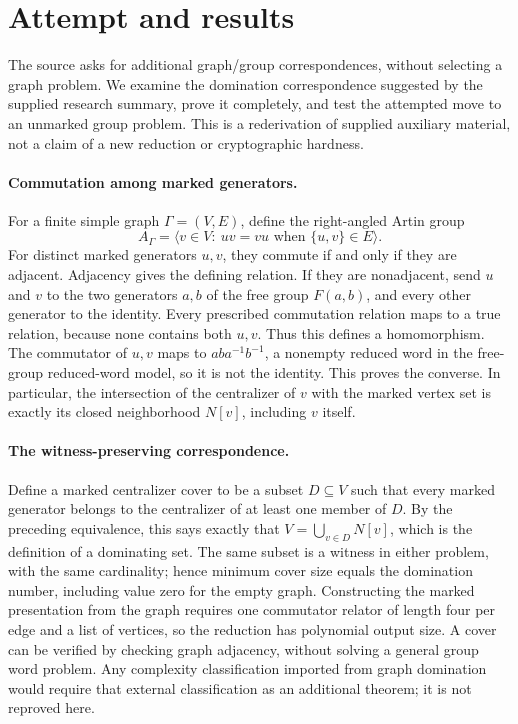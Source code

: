 \documentclass[11pt]{article}
\begin{document}
\section{Attempt and results}
The source asks for additional graph/group correspondences, without selecting
a graph problem. We examine the domination correspondence suggested by the
supplied research summary, prove it completely, and test the attempted move
to an unmarked group problem. This is a rederivation of supplied auxiliary
material, not a claim of a new reduction or cryptographic hardness.

\paragraph{Commutation among marked generators.}
For a finite simple graph $\Gamma=(V,E)$, define the right-angled Artin group
\[
A_\Gamma=\langle v\in V:\ uv=vu\text{ when }\{u,v\}\in E\rangle.
\]
For distinct marked generators $u,v$, they commute if and only if they are
adjacent. Adjacency gives the defining relation. If they are nonadjacent,
send $u$ and $v$ to the two generators $a,b$ of the free group $F(a,b)$,
and every other generator to the identity. Every prescribed commutation
relation maps to a true relation, because none contains both $u,v$.
Thus this defines a homomorphism. The commutator of $u,v$ maps to
$aba^{-1}b^{-1}$, a nonempty reduced word in the free-group reduced-word
model, so it is not the identity. This proves the converse.
In particular, the intersection of the centralizer of $v$ with the marked
vertex set is exactly its closed neighborhood $N[v]$, including $v$ itself.

\paragraph{The witness-preserving correspondence.}
Define a marked centralizer cover to be a subset $D\subseteq V$ such that
every marked generator belongs to the centralizer of at least one member of
$D$. By the preceding equivalence, this says exactly that
$V=\bigcup_{v\in D}N[v]$, which is the definition of a dominating set.
The same subset is a witness in either problem, with the same cardinality;
hence minimum cover size equals the domination number, including value zero
for the empty graph. Constructing the marked presentation from the graph
requires one commutator relator of length four per edge and a list of vertices,
so the reduction has polynomial output size. A cover can be verified by
checking graph adjacency, without solving a general group word problem.
Any complexity classification imported from graph domination would require
that external classification as an additional theorem; it is not reproved here.
\end{document}
